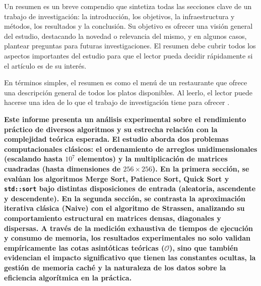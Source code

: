 Un resumen es un breve compendio que sintetiza todas las secciones clave de un trabajo de investigación: la introducción, los objetivos, la infraestructura y métodos, los resultados y la conclusión. Su objetivo es ofrecer una visión general del estudio, destacando la novedad o relevancia del mismo, y en algunos casos, plantear preguntas para futuras investigaciones. El resumen debe cubrir todos los aspectos importantes del estudio para que el lector pueda decidir rápidamente si el artículo es de su interés.

En términos simples, el resumen es como el menú de un restaurante que ofrece una descripción general de todos los platos disponibles. Al leerlo, el lector puede hacerse una idea de lo que el trabajo de investigación tiene para ofrecer \cite{elsevier_abstract_2024}.

\textbf{Este informe presenta un análisis experimental sobre el rendimiento práctico de diversos algoritmos y su estrecha relación con la complejidad teórica esperada. El estudio aborda dos problemas computacionales clásicos: el ordenamiento de arreglos unidimensionales (escalando hasta $10^7$ elementos) y la multiplicación de matrices cuadradas (hasta dimensiones de $256 \times 256$). En la primera sección, se evalúan los algoritmos Merge Sort, Patience Sort, Quick Sort y \texttt{std::sort} bajo distintas disposiciones de entrada (aleatoria, ascendente y descendente). En la segunda sección, se contrasta la aproximación iterativa clásica (Naive) con el algoritmo de Strassen, analizando su comportamiento estructural en matrices densas, diagonales y dispersas. A través de la medición exhaustiva de tiempos de ejecución y consumo de memoria, los resultados experimentales no solo validan empíricamente las cotas asintóticas teóricas ($\mathcal{O}$), sino que también evidencian el impacto significativo que tienen las constantes ocultas, la gestión de memoria caché y la naturaleza de los datos sobre la eficiencia algorítmica en la práctica.}
